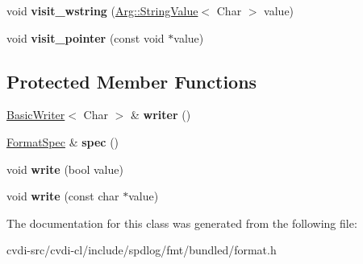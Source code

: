 \begin{DoxyCompactItemize}
\item 
void {\bfseries visit\+\_\+wstring} (\hyperlink{structfmt_1_1internal_1_1Value_1_1StringValue}{Arg\+::\+String\+Value}$<$ Char $>$ value)\hypertarget{classfmt_1_1internal_1_1ArgFormatterBase_ad3469bff1ffe51395d9f8f0e0824ff2c}{}\label{classfmt_1_1internal_1_1ArgFormatterBase_ad3469bff1ffe51395d9f8f0e0824ff2c}

\item 
void {\bfseries visit\+\_\+pointer} (const void $\ast$value)\hypertarget{classfmt_1_1internal_1_1ArgFormatterBase_a5c11af21a3e1249b78ef87c968572ef5}{}\label{classfmt_1_1internal_1_1ArgFormatterBase_a5c11af21a3e1249b78ef87c968572ef5}

\end{DoxyCompactItemize}
\subsection*{Protected Member Functions}
\begin{DoxyCompactItemize}
\item 
\hyperlink{classfmt_1_1BasicWriter}{Basic\+Writer}$<$ Char $>$ \& {\bfseries writer} ()\hypertarget{classfmt_1_1internal_1_1ArgFormatterBase_a042c1243143197b04c5b4d77a89a4fb5}{}\label{classfmt_1_1internal_1_1ArgFormatterBase_a042c1243143197b04c5b4d77a89a4fb5}

\item 
\hyperlink{structfmt_1_1FormatSpec}{Format\+Spec} \& {\bfseries spec} ()\hypertarget{classfmt_1_1internal_1_1ArgFormatterBase_acdd3bb185f7b444a60faf98fa9806ed4}{}\label{classfmt_1_1internal_1_1ArgFormatterBase_acdd3bb185f7b444a60faf98fa9806ed4}

\item 
void {\bfseries write} (bool value)\hypertarget{classfmt_1_1internal_1_1ArgFormatterBase_a002d52aca6bc9a70d7eb62c037ffadc4}{}\label{classfmt_1_1internal_1_1ArgFormatterBase_a002d52aca6bc9a70d7eb62c037ffadc4}

\item 
void {\bfseries write} (const char $\ast$value)\hypertarget{classfmt_1_1internal_1_1ArgFormatterBase_a1a706cd6067d51bfa07d5e6c577e0843}{}\label{classfmt_1_1internal_1_1ArgFormatterBase_a1a706cd6067d51bfa07d5e6c577e0843}

\end{DoxyCompactItemize}


The documentation for this class was generated from the following file\+:\begin{DoxyCompactItemize}
\item 
cvdi-\/src/cvdi-\/cl/include/spdlog/fmt/bundled/format.\+h\end{DoxyCompactItemize}
